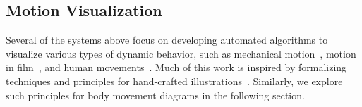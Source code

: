 



\subsection{Motion Visualization}

Several of the systems above focus on developing automated algorithms to visualize various types of dynamic behavior, such as mechanical motion~\cite{li2008automated,mitra2010illustrating}, motion in film~\cite{goldman2006schematic}, and human movements~\cite{assa2005action,bouvier2007motion,choi2012retrieval}.
%
Much of this work is inspired by formalizing techniques and principles for hand-crafted illustrations~\cite{agrawala2011principles}. Similarly, we explore such principles for body movement diagrams in the following section.

